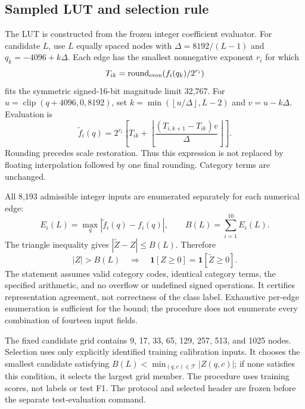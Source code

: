 \documentclass{ieeeaccess}
\newcommand{\floor}[1]{\left\lfloor #1\right\rfloor}
\begin{document}
\subsection{Sampled LUT and selection rule}
\label{sec:lut}
The LUT is constructed from the frozen integer coefficient evaluator. For candidate $L$, use $L$ equally spaced nodes with $\Delta=8192/(L-1)$ and $q_k=-4096+k\Delta$. Each edge has the smallest nonnegative exponent $r_i$ for which
\begin{equation}
T_{ik}=\operatorname{round}_{\rm even}(f_i(q_k)/2^{r_i})
\end{equation}
fits the symmetric signed-16-bit magnitude limit 32,767. For $u=\operatorname{clip}(q+4096,0,8192)$, set $k=\min(\floor{u/\Delta},L-2)$ and $v=u-k\Delta$. Evaluation is
\begin{equation}
\widetilde f_i(q)=2^{r_i}\left[T_{ik}+\floor{\frac{(T_{i,k+1}-T_{ik})v}{\Delta}}\right].
\label{eq:lut}
\end{equation}
Rounding precedes scale restoration. Thus this expression is not replaced by floating interpolation followed by one final rounding. Category terms are unchanged.

All 8,193 admissible integer inputs are enumerated separately for each numerical edge:
\begin{equation}
E_i(L)=\max_q|\widetilde f_i(q)-f_i(q)|,\qquad
B(L)=\sum_{i=1}^{10}E_i(L).
\end{equation}
The triangle inequality gives $|\widetilde Z-Z|\leq B(L)$. Therefore
\begin{equation}
|Z|>B(L)\quad\Longrightarrow\quad
\mathbf1[Z\geq0]=\mathbf1[\widetilde Z\geq0].
\label{eq:certificate}
\end{equation}
The statement assumes valid category codes, identical category terms, the specified arithmetic, and no overflow or undefined signed operations. It certifies representation agreement, not correctness of the class label. Exhaustive per-edge enumeration is sufficient for the bound; the procedure does not enumerate every combination of fourteen input fields.

The fixed candidate grid contains 9, 17, 33, 65, 129, 257, 513, and 1025 nodes. Selection uses only explicitly identified training calibration inputs. It chooses the smallest candidate satisfying $B(L)<\min_{(q,c)\in\mathcal T}|Z(q,c)|$; if none satisfies this condition, it selects the largest grid member. The procedure uses training scores, not labels or test F1. The protocol and selected header are frozen before the separate test-evaluation command.
\end{document}
